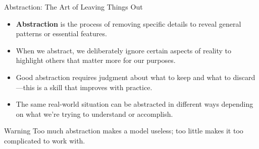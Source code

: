 \documentclass{beamer}
\begin{document}
	\begin{frame}{Abstraction: The Art of Leaving Things Out}
		\begin{itemize}
			\item \textbf{Abstraction} is the process of removing specific details to reveal general patterns or essential features.
			\item When we abstract, we deliberately ignore certain aspects of reality to highlight others that matter more for our purposes.
			\item Good abstraction requires judgment about what to keep and what to discard—this is a skill that improves with practice.
			\item The same real-world situation can be abstracted in different ways depending on what we're trying to understand or accomplish.
		\end{itemize}
		
		\begin{alertblock}{Warning}
			Too much abstraction makes a model useless; too little makes it too complicated to work with.
		\end{alertblock}
	\end{frame}
	
\end{document}
